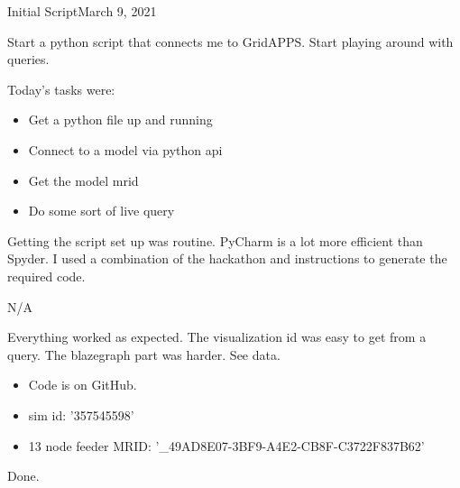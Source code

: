 
\begin{entry}{Initial Script}{March 9, 2021}
    \objective

    Start a python script that connects me to GridAPPS. Start playing around with queries.

    \outline

    Today's tasks were:
        \begin{itemize}
            \item Get a python file up and running
            \item Connect to a model via python api
            \item Get the model mrid
            \item Do some sort of live query
        \end{itemize}

    \procedures

        Getting the script set up was routine. PyCharm is a lot more efficient than Spyder.
        I used a combination of the hackathon and instructions to generate the required code.

    \parameters

    N/A

    \observations

        Everything worked as expected. The visualization id was easy to get from a query. The
        blazegraph part was harder. See data.

    \data
    \begin{itemize}
        \item Code is on GitHub.
        \item sim id: '357545598'
        \item 13 node feeder MRID: '_49AD8E07-3BF9-A4E2-CB8F-C3722F837B62'
    \end{itemize}




    \results

    Done.

\end{entry}